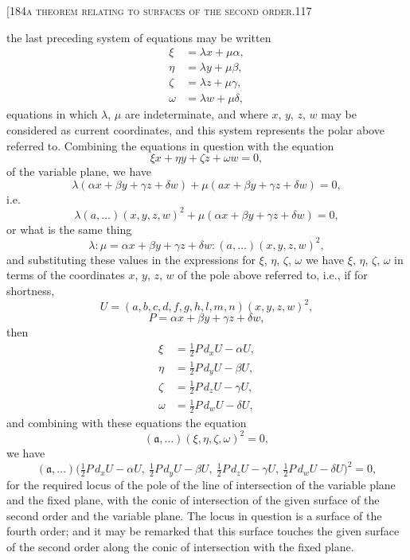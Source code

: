 \documentclass[11pt]{article}
\begin{document}
\begin{center}\small[184\hfill\textsc{a theorem relating to surfaces of the second order.}\hfill\textsc{117}\end{center}

\noindent the last preceding system of equations may be written
\[
\begin{aligned}
\xi &= \lambda x + \mu\alpha,\\
\eta &= \lambda y + \mu\beta,\\
\zeta &= \lambda z + \mu\gamma,\\
\omega &= \lambda w + \mu\delta,
\end{aligned}
\]
equations in which $\lambda$, $\mu$ are indeterminate, and where $x$, $y$, $z$, $w$ may be considered
as current coordinates, and this system represents the polar above referred to. Combining the equations in question with the equation
\[
\xi x + \eta y + \zeta z + \omega w = 0,
\]
of the variable plane, we have
\[
\lambda(\alpha x + \beta y + \gamma z + \delta w) + \mu(ax + \beta y + \gamma z + \delta w) = 0,
\]
i.e.
\[
\lambda(a,\ldots)(x,y,z,w)^{2} + \mu(\alpha x + \beta y + \gamma z + \delta w) = 0,
\]
or what is the same thing
\[
\lambda : \mu = \alpha x + \beta y + \gamma z + \delta w : (a,\ldots)(x,y,z,w)^{2},
\]
and substituting these values in the expressions for $\xi$, $\eta$, $\zeta$, $\omega$ we have $\xi$, $\eta$, $\zeta$, $\omega$ in
terms of the coordinates $x$, $y$, $z$, $w$ of the pole above referred to, i.e., if for shortness,
\[
U = (a,b,c,d,f,g,h,l,m,n)(x,y,z,w)^{2},
\]
\[
P = \alpha x + \beta y + \gamma z + \delta w,
\]
then
\[
\begin{aligned}
\xi &= \tfrac{1}{2}P\, d_{x}U - \alpha U,\\
\eta &= \tfrac{1}{2}P\, d_{y}U - \beta U,\\
\zeta &= \tfrac{1}{2}P\, d_{z}U - \gamma U,\\
\omega &= \tfrac{1}{2}P\, d_{w}U - \delta U,
\end{aligned}
\]
and combining with these equations the equation
\[
(\mathfrak{a},\ldots)(\xi,\eta,\zeta,\omega)^{2} = 0,
\]
we have
\[
(\mathfrak{a},\ldots)\bigl(\tfrac{1}{2}P\, d_{x}U - \alpha U,\ \tfrac{1}{2}P\, d_{y}U - \beta U,\ \tfrac{1}{2}P\, d_{z}U - \gamma U,\ \tfrac{1}{2}P\, d_{w}U - \delta U\bigr)^{2} = 0,
\]
for the required locus of the pole of the line of intersection of the variable plane
and the fixed plane, with the conic of intersection of the given surface of the second
order and the variable plane. The locus in question is a surface of the fourth order;
and it may be remarked that this surface touches the given surface of the second
order along the conic of intersection with the fixed plane.
\end{document}
